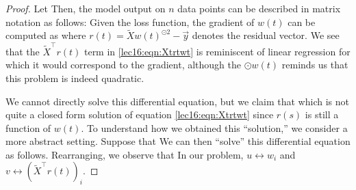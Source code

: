 \begin{proof}  
Let
Then, the model output on $n$ data points can be described in matrix notation as follows:
Given the loss function,
the gradient of $w(t)$ can be computed as
where $r(t) = \tilde{X} w(t)^{\odot 2} - \vec{y}$ denotes the residual vector.  We see that the $\tilde{X}^\top r(t)$ term in \eqref{lec16:eqn:Xtrtwt} is reminiscent of linear regression for which it would correspond to the gradient, although the $\odot w(t)$ reminds us that this problem is indeed quadratic.

We cannot directly solve this differential equation, but we claim that
which is not quite a closed form solution of equation \ref{lec16:eqn:Xtrtwt} since $r(s)$ is still a function of $w(t)$.  To understand how we obtained this ``solution,'' we consider a more abstract setting. Suppose that
We can then ``solve'' this differential equation as follows. Rearranging, we observe that
In our problem, $u \leftrightarrow w_i$ and $v \leftrightarrow (\tilde{X}^\top r(t))_i$.


\end{proof}
